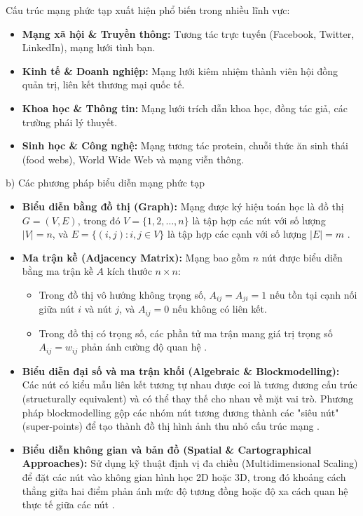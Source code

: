 \documentclass[14pt,a4paper]{extarticle}
\begin{document}
Cấu trúc mạng phức tạp xuất hiện phổ biến trong nhiều lĩnh vực:
\begin{itemize}
    \item \textbf{Mạng xã hội \& Truyền thông:} Tương tác trực tuyến (Facebook, Twitter, LinkedIn), mạng lưới tình bạn.
    \item \textbf{Kinh tế \& Doanh nghiệp:} Mạng lưới kiêm nhiệm thành viên hội đồng quản trị, liên kết thương mại quốc tế.
    \item \textbf{Khoa học \& Thông tin:} Mạng lưới trích dẫn khoa học, đồng tác giả, các trường phái lý thuyết.
    \item \textbf{Sinh học \& Công nghệ:} Mạng tương tác protein, chuỗi thức ăn sinh thái (food webs), World Wide Web và mạng viễn thông.
\end{itemize}

\noindent b) Các phương pháp biểu diễn mạng phức tạp \\
\begin{itemize}
    \item \textbf{Biểu diễn bằng đồ thị (Graph):} Mạng được ký hiệu toán học là đồ thị $G = (V, E)$, trong đó $V = \{1, 2, \dots, n\}$ là tập hợp các nút với số lượng $|V| = n$, và $E = \{(i, j) : i, j \in V\}$ là tập hợp các cạnh với số lượng $|E| = m$ \cite{Traag2014}.
    
    \item \textbf{Ma trận kề (Adjacency Matrix):} Mạng bao gồm $n$ nút được biểu diễn bằng ma trận kề $A$ kích thước $n \times n$:
    \begin{itemize}
        \item Trong đồ thị vô hướng không trọng số, $A_{ij} = A_{ji} = 1$ nếu tồn tại cạnh nối giữa nút $i$ và nút $j$, và $A_{ij} = 0$ nếu không có liên kết.
        \item Trong đồ thị có trọng số, các phần tử ma trận mang giá trị trọng số $A_{ij} = w_{ij}$ phản ánh cường độ quan hệ \cite{Traag2014}.
    \end{itemize}
    
    \item \textbf{Biểu diễn đại số và ma trận khối (Algebraic \& Blockmodelling):} Các nút có kiểu mẫu liên kết tương tự nhau được coi là tương đương cấu trúc (structurally equivalent) và có thể thay thế cho nhau về mặt vai trò. Phương pháp blockmodelling gộp các nhóm nút tương đương thành các "siêu nút" (super-points) để tạo thành đồ thị hình ảnh thu nhỏ cấu trúc mạng \cite{Scott2012}.
    \item \textbf{Biểu diễn không gian và bản đồ (Spatial \& Cartographical Approaches):} Sử dụng kỹ thuật định vị đa chiều (Multidimensional Scaling) để đặt các nút vào không gian hình học 2D hoặc 3D, trong đó khoảng cách thẳng giữa hai điểm phản ánh mức độ tương đồng hoặc độ xa cách quan hệ thực tế giữa các nút \cite{Scott2012}.
\end{itemize}
\end{document}
